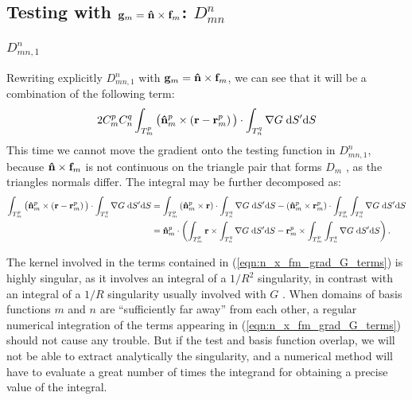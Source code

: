 \subsection{Testing with $\mathbf{g}_m = \mathbf{\Hat{n}} \times \mathbf{f}_m$: $D_{mn}^n$}

\subsubsection{$D_{mn,1}^n$}
%
\par
Rewriting explicitly $D_{mn,1}^n$ with $\mathbf{g}_m = \mathbf{\Hat{n}} \times \mathbf{f}_m$, we can see that it will be a combination of the following term:
\begin{equation}
2 C_m^p C_n^q \int_{T_m^p} \big(\mathbf{\Hat{n}}_m^p \times \left(\mathbf{r}-\mathbf{r}_m^p \right) \big) \cdot \int_{T_n^q} \nabla G \; \text{d} S' \text{d} S
\end{equation}
This time we cannot move the gradient onto the testing function in $D_{mn,1}^n$, because $\mathbf{\Hat{n}} \times \mathbf{f}_m$ is not continuous on the triangle pair that forms $D_m$ \cite{Taskinen_03}, as the triangles normals differ. The integral may be further decomposed as:
\begin{equation} \label{eqn:n_x_fm_grad_G_terms}
\begin{split}
\int_{T_m^p} \big(\mathbf{\Hat{n}}_m^p \times \left(\mathbf{r}-\mathbf{r}_m^p \right) \big) \cdot \int_{T_n^q} \nabla G \; \text{d} S' \text{d} S & = \int_{T_m^p} \left(\mathbf{\Hat{n}}_m^p \times \mathbf{r} \right) \cdot \int_{T_n^q} \nabla G \; \text{d} S' \text{d} S - \left(\mathbf{\Hat{n}}_m^p \times \mathbf{r}_m^p\right) \cdot \int_{T_m^p} \int_{T_n^q} \nabla G \; \text{d} S' \text{d} S \\
& = \mathbf{\Hat{n}}_m^p \cdot \left(\int_{T_m^p} \mathbf{r} \times \int_{T_n^q} \nabla G \; \text{d} S' \text{d} S - \mathbf{r}_m^p \times \int_{T_m^p} \int_{T_n^q} \nabla G \; \text{d} S' \text{d} S\right).
\end{split}
\end{equation}
%
\par
The kernel involved in the terms contained in (\ref{eqn:n_x_fm_grad_G_terms}) is highly singular, as it involves an integral of a $1/R^2$ singularity, in contrast with an integral of a $1/R$ singularity usually involved with $G$ \cite{Taskinen_03}. When domains of basis functions $m$ and $n$ are ``sufficiently far away'' from each other, a regular numerical integration of the terms appearing in (\ref{eqn:n_x_fm_grad_G_terms}) should not cause any trouble. But if the test and basis function overlap, we will not be able to extract analytically the singularity, and a numerical method will have to evaluate a great number of times the integrand for obtaining a precise value of the integral. 
